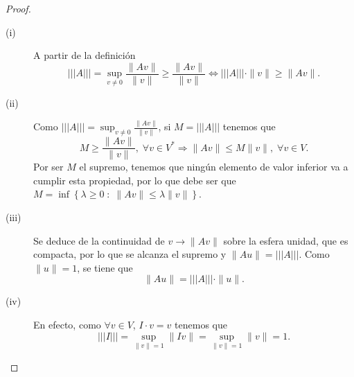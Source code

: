 \documentclass{article}
\begin{document}
\begin{proof}
\begin{description}
\item[(i)] A partir de la definición
	\[ | | | A | | | = \sup_{v \neq 0}\frac{\|Av\|}{\|v\|} \geq \frac{\|Av\|}{\|v\|} \iff | | | A | | | \cdot \|v\| \geq \|Av\| .\]
\item[(ii)] Como $\displaystyle | | | A | | | = \sup_{ v \neq 0}\frac{\|Av\|}{\|v\|} $, si $\displaystyle M = | | | A | | | $ tenemos que 
	\[M \geq \frac{\|Av\|}{\|v\|}, \; \forall v \in V^{*} \Rightarrow \|Av\| \leq M \|v\|, \; \forall v \in V .\]
	Por ser $\displaystyle M $ el supremo, tenemos que ningún elemento de valor inferior va a cumplir esta propiedad, por lo que debe ser que $\displaystyle M = \inf \left\{ \lambda \geq 0 \; : \; \|Av\| \leq \lambda \|v\|\right\}  $.
\item[(iii)] Se deduce de la continuidad de $\displaystyle v \to \|Av\| $ sobre la esfera unidad, que es compacta, por lo que se alcanza el supremo y $\displaystyle \|Au\| = | | | A | | |$. Como $\displaystyle \|u\| = 1 $, se tiene que 
	\[\|Au\| = | | | A | | | \cdot \|u\| .\]
\item[(iv)] En efecto, como $\displaystyle \forall v \in V $, $\displaystyle I \cdot v = v $ tenemos que
	\[ | | | I | | | = \sup_{ \|v\|= 1} \|Iv\| = \sup_{ \|v\| = 1}\|v\| = 1 .\]
\end{description}
\end{proof}
\end{document}
